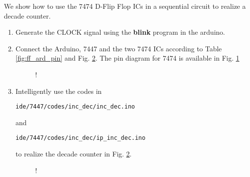 We show how to use the 7474 D-Flip Flop ICs in
a sequential circuit to realize a decade counter.
\iffalse
\subsection{Components}
\begin{table}[H]
\centering

\caption{}
\label{table:components-7474}
\end{table}
\fi
\begin{enumerate}[label=\arabic*.,ref=\theenumi]
\item
Generate the CLOCK signal using the \textbf{blink} program in the arduino. 
\item
Connect the Arduino, 7447 and the two 7474 ICs according to Table \ref{fig:ff_ard_pin} and Fig. \ref{fig:decade_counter}. The pin diagram for 7474 is available in Fig. \ref{fig:7474}
			\begin{table}[H]
\centering

\caption{}
\label{fig:ff_ard_pin}
\end{table}
%
\begin{figure}[H]
\begin{center}
\resizebox {0.75\columnwidth} {!} {

}
\end{center}
\caption{}
\label{fig:7474}
\end{figure}

%
\item
Intelligently use the codes in 
\begin{lstlisting}
ide/7447/codes/inc_dec/inc_dec.ino
\end{lstlisting}
and
\begin{lstlisting}
ide/7447/codes/inc_dec/ip_inc_dec.ino
\end{lstlisting}
to realize the decade counter in Fig. \ref{fig:decade_counter}.
% 
 \begin{figure}[H]
\begin{center}
\resizebox {0.75\columnwidth} {!} {

}
\end{center}
\caption{}
\label{fig:decade_counter}
\end{figure}
%
	\end{enumerate}


